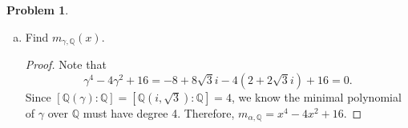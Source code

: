 \documentclass[11pt]{article}
\newcommand{\Q}{\mathbb{Q}}
\theoremstyle{definition}
\newtheorem{problem}{Problem}
\begin{document}
\begin{problem}
\begin{enumerate}[a)]
\begin{proof} 
Let $\gamma = \sqrt{3} + i$. Since $\gamma \in \Q(i, \sqrt{3})$, we have $\Q(\gamma) \subseteq \Q(i, \sqrt{3})$. Note that 
$$\begin{aligned}
\gamma^2 & = 2 + 2 \sqrt{3} i\\
\gamma^3 & = 8i \\
\gamma^4 & = -8 + 8 \sqrt{3}i.
\end{aligned}$$

Thus $i = \frac{1}{8} \gamma^3 \in \Q(\gamma)$ and $\sqrt{3} = \gamma - \frac{1}{8} \gamma^3 \in \Q(\gamma)$. We conclude that $\Q(\gamma) = \Q(i, \sqrt{3})$ and thus $\gamma$ is a primitive element.
\end{proof}

\item Find $m_{\gamma, \Q}(x)$.

\begin{proof}
	Note that 
	$$\gamma^4 - 4 \gamma^2 + 16 = -8 + 8 \sqrt{3}i -4 (2 + 2 \sqrt{3} i)+ 16= 0.$$ 
	Since $[\Q(\gamma): \Q] = [\Q(i, \sqrt{3}): \Q] = 4$, we know the minimal polynomial of $\gamma$ over $\Q$ must have degree 4. Therefore, $m_{\alpha, \Q} = x^4 - 4x^2 + 16$.
\end{proof}
\end{enumerate}
\end{problem}
\end{document}
